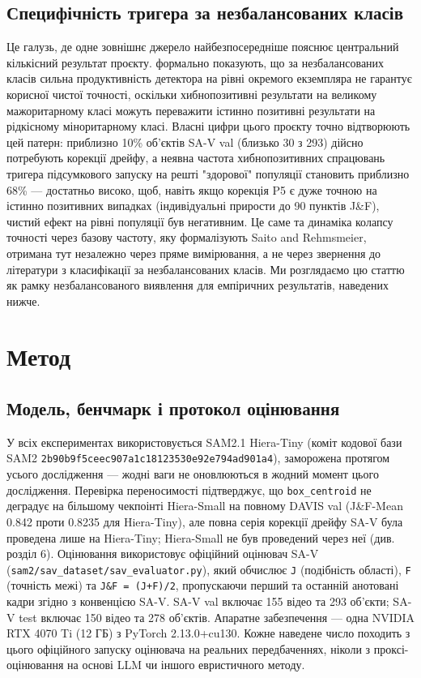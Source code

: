 \documentclass[11pt]{article}
\begin{document}
\subsection{Специфічність тригера за незбалансованих класів}

Це галузь, де одне зовнішнє джерело найбезпосередніше пояснює центральний кількісний результат проєкту. \citet{saito2015} формально показують, що за незбалансованих класів сильна продуктивність детектора на рівні окремого екземпляра не гарантує корисної чистої точності, оскільки хибнопозитивні результати на великому мажоритарному класі можуть переважити істинно позитивні результати на рідкісному міноритарному класі. Власні цифри цього проєкту точно відтворюють цей патерн: приблизно 10\% об'єктів SA-V val (близько 30 з 293) дійсно потребують корекції дрейфу, а неявна частота хибнопозитивних спрацювань тригера підсумкового запуску на решті "здорової" популяції становить приблизно 68\% --- достатньо високо, щоб, навіть якщо корекція P5 є дуже точною на істинно позитивних випадках (індивідуальні прирости до 90 пунктів J\&F), чистий ефект на рівні популяції був негативним. Це саме та динаміка колапсу точності через базову частоту, яку формалізують Saito and Rehmsmeier, отримана тут незалежно через пряме вимірювання, а не через звернення до літератури з класифікації за незбалансованих класів. Ми розглядаємо цю статтю як рамку незбалансованого виявлення для емпіричних результатів, наведених нижче.

\section{Метод}

\subsection{Модель, бенчмарк і протокол оцінювання}

У всіх експериментах використовується SAM2.1 Hiera-Tiny (коміт кодової бази SAM2 \texttt{2b90b9f5ceec907a1c18\allowbreak 123530e92e794ad901a4}), заморожена протягом усього дослідження --- жодні ваги не оновлюються в жодний момент цього дослідження. Перевірка переносимості підтверджує, що \texttt{box\_centroid} не деградує на більшому чекпоінті Hiera-Small на повному DAVIS val (J\&F-Mean 0.842 проти 0.8235 для Hiera-Tiny), але повна серія корекції дрейфу SA-V була проведена лише на Hiera-Tiny; Hiera-Small не був проведений через неї (див. розділ 6). Оцінювання використовує офіційний оцінювач SA-V (\texttt{sam2/sav\_dataset/sav\_evaluator.py}), який обчислює \texttt{J} (подібність області), \texttt{F} (точність межі) та \texttt{J\&F = (J+F)/2}, пропускаючи перший та останній анотовані кадри згідно з конвенцією SA-V. SA-V val включає 155 відео та 293 об'єкти; SA-V test включає 150 відео та 278 об'єктів. Апаратне забезпечення --- одна NVIDIA RTX 4070 Ti (12 ГБ) з PyTorch 2.13.0+cu130. Кожне наведене число походить з цього офіційного запуску оцінювача на реальних передбаченнях, ніколи з проксі-оцінювання на основі LLM чи іншого евристичного методу.
\end{document}
